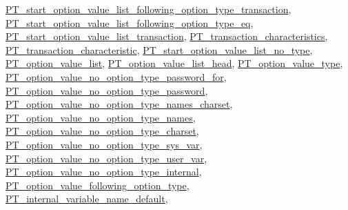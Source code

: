 \mbox{\hyperlink{classPT__start__option__value__list__following__option__type__transaction_ac15edbbf907d20a95c589a0e1e016e2a}{P\+T\+\_\+start\+\_\+option\+\_\+value\+\_\+list\+\_\+following\+\_\+option\+\_\+type\+\_\+transaction}}, \mbox{\hyperlink{classPT__start__option__value__list__following__option__type__eq_a748b216be3de04a1f758284578b630c2}{P\+T\+\_\+start\+\_\+option\+\_\+value\+\_\+list\+\_\+following\+\_\+option\+\_\+type\+\_\+eq}}, \mbox{\hyperlink{classPT__start__option__value__list__transaction_aec9fbcabdc159f19244db60e3ca5d59e}{P\+T\+\_\+start\+\_\+option\+\_\+value\+\_\+list\+\_\+transaction}}, \mbox{\hyperlink{classPT__transaction__characteristics_a6f73b4c891ed99b6ffaccb1abb4cb2e4}{P\+T\+\_\+transaction\+\_\+characteristics}}, \mbox{\hyperlink{classPT__transaction__characteristic_afea326fbb1ad30e10a057b10f7a9ef6c}{P\+T\+\_\+transaction\+\_\+characteristic}}, \mbox{\hyperlink{classPT__start__option__value__list__no__type_ab92ce1db2e283950ed9dedc12cd89ca9}{P\+T\+\_\+start\+\_\+option\+\_\+value\+\_\+list\+\_\+no\+\_\+type}}, \mbox{\hyperlink{classPT__option__value__list_a11d23499d057d978727592d5b9d366c2}{P\+T\+\_\+option\+\_\+value\+\_\+list}}, \mbox{\hyperlink{classPT__option__value__list__head_a211f236acebccd35113f7f991dc9d2fb}{P\+T\+\_\+option\+\_\+value\+\_\+list\+\_\+head}}, \mbox{\hyperlink{classPT__option__value__type_ad23aea78845316211737dd90b3515663}{P\+T\+\_\+option\+\_\+value\+\_\+type}}, \mbox{\hyperlink{classPT__option__value__no__option__type__password__for_adcaa99ced0dfdcc5f0b706499a9c6ad1}{P\+T\+\_\+option\+\_\+value\+\_\+no\+\_\+option\+\_\+type\+\_\+password\+\_\+for}}, \mbox{\hyperlink{classPT__option__value__no__option__type__password_a3c352bcf85ffefcfa3cd524691061a9d}{P\+T\+\_\+option\+\_\+value\+\_\+no\+\_\+option\+\_\+type\+\_\+password}}, \mbox{\hyperlink{classPT__option__value__no__option__type__names__charset_aa54fc142e0ce2603ed24149c673a1ee9}{P\+T\+\_\+option\+\_\+value\+\_\+no\+\_\+option\+\_\+type\+\_\+names\+\_\+charset}}, \mbox{\hyperlink{classPT__option__value__no__option__type__names_a3d4e80876b3575185f363e96a550f250}{P\+T\+\_\+option\+\_\+value\+\_\+no\+\_\+option\+\_\+type\+\_\+names}}, \mbox{\hyperlink{classPT__option__value__no__option__type__charset_a5319e9cc9f8e9bd27b1818eec8681c20}{P\+T\+\_\+option\+\_\+value\+\_\+no\+\_\+option\+\_\+type\+\_\+charset}}, \mbox{\hyperlink{classPT__option__value__no__option__type__sys__var_abd287cc5111f786a62032da4ff2b518f}{P\+T\+\_\+option\+\_\+value\+\_\+no\+\_\+option\+\_\+type\+\_\+sys\+\_\+var}}, \mbox{\hyperlink{classPT__option__value__no__option__type__user__var_af5670585b4c428d1dc13e282ce534605}{P\+T\+\_\+option\+\_\+value\+\_\+no\+\_\+option\+\_\+type\+\_\+user\+\_\+var}}, \mbox{\hyperlink{classPT__option__value__no__option__type__internal_a150386fb905d43f09154f649b8081c67}{P\+T\+\_\+option\+\_\+value\+\_\+no\+\_\+option\+\_\+type\+\_\+internal}}, \mbox{\hyperlink{classPT__option__value__following__option__type_ac38fe2a0672f3a45cbf3276ca1854961}{P\+T\+\_\+option\+\_\+value\+\_\+following\+\_\+option\+\_\+type}}, \mbox{\hyperlink{classPT__internal__variable__name__default_a70dbec6cbccf1052e838c296cc97f24a}{P\+T\+\_\+internal\+\_\+variable\+\_\+name\+\_\+default}}, 